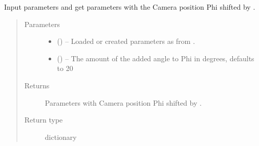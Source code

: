 \documentclass[letterpaper,10pt,english]{sphinxmanual}
\begin{document}
\begin{fulllineitems}
\begin{fulllineitems}
\end{fulllineitems}


\begin{fulllineitems}
\label{\detokenize{index:dataset.dataset_cuboids.change_apperence_camera_phi_relative}}
Input parameters and get parameters with the Camera position Phi shifted by .
\begin{quote}\begin{description}
\item[{Parameters}] \leavevmode\begin{itemize}
\item {} 
 () -- Loaded or created parameters as from {\hyperref[\detokenize{index:dataset.dataset_cuboids.create_random_parameters}]{}}.

\item {} 
 (\sphinxstyleliteralemphasis{\sphinxupquote{, }}) -- The amount of the added angle to Phi in degrees, defaults to 20

\end{itemize}

\item[{Returns}] \leavevmode
Parameters with Camera position Phi shifted by .

\item[{Return type}] \leavevmode
dictionary

\end{description}\end{quote}

\end{fulllineitems}



\end{fulllineitems}
\end{document}
